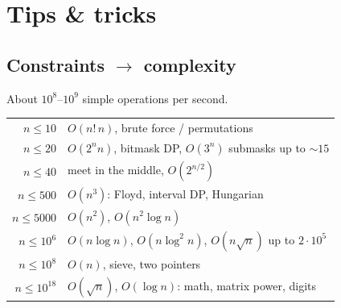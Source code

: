 \chapter{Tips \& tricks}

\section{Constraints $\to$ complexity}
About $10^8$--$10^9$ simple operations per second.
\begin{center}\small
\begin{tabular}{r|l}
$n \le 10$ & $O(n!\, n)$, brute force / permutations \\
$n \le 20$ & $O(2^n n)$, bitmask DP, $O(3^n)$ submasks up to $\sim 15$ \\
$n \le 40$ & meet in the middle, $O(2^{n/2})$ \\
$n \le 500$ & $O(n^3)$: Floyd, interval DP, Hungarian \\
$n \le 5000$ & $O(n^2)$, $O(n^2 \log n)$ \\
$n \le 10^6$ & $O(n \log n)$, $O(n \log^2 n)$, $O(n\sqrt n)$ up to $2\cdot 10^5$ \\
$n \le 10^8$ & $O(n)$, sieve, two pointers \\
$n \le 10^{18}$ & $O(\sqrt n)$, $O(\log n)$: math, matrix power, digits
\end{tabular}
\end{center}

